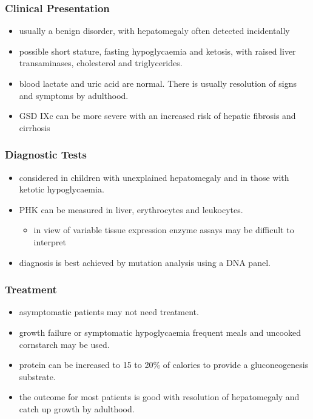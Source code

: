\documentclass{scrartcl}
\begin{document}
\subsubsection{Clinical Presentation}
\label{sec:orge70d939}
\begin{itemize}
\item usually a benign disorder, with hepatomegaly often detected
incidentally
\item possible short stature, fasting hypoglycaemia and ketosis, with
raised liver transaminases, cholesterol and triglycerides.
\item blood lactate and uric acid are normal. There is usually resolution
of signs and symptoms by adulthood.
\item GSD IXc can be more severe with an increased risk of hepatic fibrosis and cirrhosis
\end{itemize}

\subsubsection{Diagnostic Tests}
\label{sec:orgf80f3f2}
\begin{itemize}
\item considered in children with unexplained hepatomegaly and in those with ketotic hypoglycaemia.
\item PHK can be measured in liver, erythrocytes and leukocytes.
\begin{itemize}
\item in view of variable tissue expression enzyme assays may be
difficult to interpret
\end{itemize}
\item diagnosis is best achieved by mutation analysis using a DNA panel.
\end{itemize}
\subsubsection{Treatment}
\label{sec:orgc75fa13}
\begin{itemize}
\item asymptomatic patients may not need treatment.
\item growth failure or symptomatic hypoglycaemia frequent meals and
uncooked cornstarch may be used.
\item protein can be increased to 15 to 20\% of calories to provide a
gluconeogenesis substrate.
\item the outcome for most patients is good with resolution of
hepatomegaly and catch up growth by adulthood.
\end{itemize}
\end{document}
